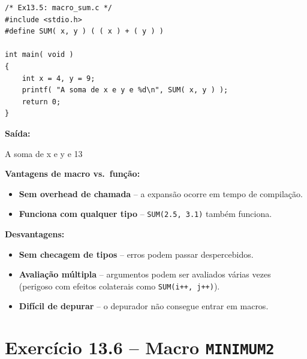 \documentclass[12pt,a4paper]{article}
\begin{document}
\begin{respostabox}
\begin{lstlisting}
/* Ex13.5: macro_sum.c */
#include <stdio.h>
#define SUM( x, y ) ( ( x ) + ( y ) )

int main( void )
{
    int x = 4, y = 9;
    printf( "A soma de x e y e %d\n", SUM( x, y ) );
    return 0;
}
\end{lstlisting}

\textbf{Saída:}
\begin{saida}
A soma de x e y e 13
\end{saida}

\textbf{Vantagens de macro vs.\ função:}
\begin{itemize}[noitemsep]
  \item \textbf{Sem overhead de chamada} -- a expansão ocorre em tempo de compilação.
  \item \textbf{Funciona com qualquer tipo} -- \texttt{SUM(2.5, 3.1)} também funciona.
\end{itemize}

\textbf{Desvantagens:}
\begin{itemize}[noitemsep]
  \item \textbf{Sem checagem de tipos} -- erros podem passar despercebidos.
  \item \textbf{Avaliação múltipla} -- argumentos podem ser avaliados várias vezes
  (perigoso com efeitos colaterais como \texttt{SUM(i++, j++)}).
  \item \textbf{Difícil de depurar} -- o depurador não consegue entrar em macros.
\end{itemize}
\end{respostabox}

\section{Exercício 13.6 -- Macro \texttt{MINIMUM2}}
\end{document}
